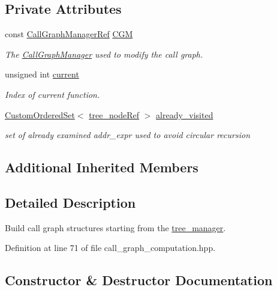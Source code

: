 \subsection*{Private Attributes}
\begin{DoxyCompactItemize}
\item 
const \hyperlink{call__graph__manager_8hpp_aefd741adcd456a04c45fd3df98acdb2c}{Call\+Graph\+Manager\+Ref} \hyperlink{classcall__graph__computation_a0fc3513c7a0653b51c5a8b9f5607e3a5}{C\+GM}
\begin{DoxyCompactList}\small\item\em The \hyperlink{classCallGraphManager}{Call\+Graph\+Manager} used to modify the call graph. \end{DoxyCompactList}\item 
unsigned int \hyperlink{classcall__graph__computation_a100a2728b8a5952e3e969c1beeb7a883}{current}
\begin{DoxyCompactList}\small\item\em Index of current function. \end{DoxyCompactList}\item 
\hyperlink{classCustomOrderedSet}{Custom\+Ordered\+Set}$<$ \hyperlink{tree__node_8hpp_a6ee377554d1c4871ad66a337eaa67fd5}{tree\+\_\+node\+Ref} $>$ \hyperlink{classcall__graph__computation_add82c2da1d89c88376c84c30415e94d1}{already\+\_\+visited}
\begin{DoxyCompactList}\small\item\em set of already examined addr\+\_\+expr used to avoid circular recursion \end{DoxyCompactList}\end{DoxyCompactItemize}
\subsection*{Additional Inherited Members}


\subsection{Detailed Description}
Build call graph structures starting from the \hyperlink{classtree__manager}{tree\+\_\+manager}. 

Definition at line 71 of file call\+\_\+graph\+\_\+computation.\+hpp.



\subsection{Constructor \& Destructor Documentation}
\mbox{\label{classcall__graph__computation_a91e8b90eb5bc3b1b9db1b9487cd51f9b}} 

